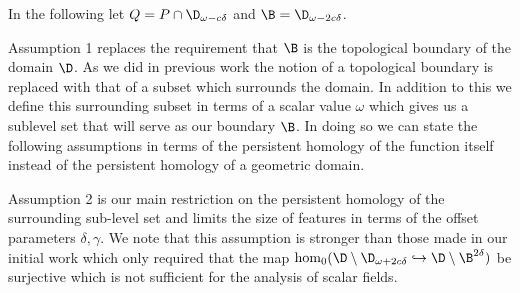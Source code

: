 

\vspace{2ex}
\begin{center}
\setlength{\fboxsep}{2ex}
\end{center}\vspace{4ex}

In the following let $Q = P\cap \D_{\omega - c\delta}$ and $\B = \D_{\omega-2c\delta}$.

Assumption 1 replaces the requirement that $\B$ is the topological boundary of the domain $\D$.
As we did in previous work the notion of a topological boundary is replaced with that of a subset which surrounds the domain.
In addition to this we define this surrounding subset in terms of a scalar value $\omega$ which gives us a sublevel set that will serve as our boundary $\B$.
In doing so we can state the following assumptions in terms of the persistent homology of the function itself instead of the persistent homology of a geometric domain.

Assumption 2 is our main restriction on the persistent homology of the surrounding sub-level set and limits the size of features in terms of the offset parameters $\delta,\gamma$.
We note that this assumption is stronger than those made in our initial work which only required that the map $\hom_0(\D\setminus\D_{\omega+2c\delta}\hookrightarrow\D\setminus\B^{2\delta})$ be surjective which is not sufficient for the analysis of scalar fields.

